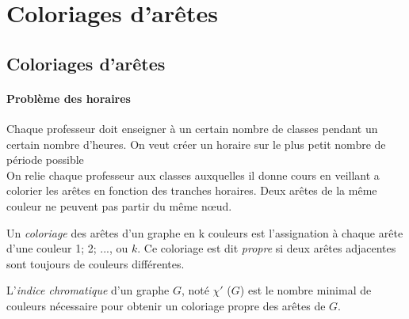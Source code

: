 \section{Coloriages d'arêtes}
\subsection{Coloriages d'arêtes}

\paragraph{Problème des horaires}
Chaque professeur doit enseigner à un certain nombre de classes pendant un certain nombre d'heures. On veut créer
un horaire sur le plus petit nombre de période possible
\\On relie chaque professeur aux classes auxquelles il donne cours en veillant a colorier les arêtes en fonction des tranches horaires. Deux arêtes de la même couleur ne peuvent pas partir du même nœud.

\begin{mydef}
  Un \emph{coloriage} des arêtes d’un graphe en k couleurs est l’assignation à chaque arête d’une couleur 1; 2; ..., ou $k$. Ce coloriage est dit \emph{propre} si deux arêtes adjacentes sont toujours de couleurs différentes.
\end{mydef}

\begin{mydef}
  L’\emph{indice chromatique} d’un graphe $G$, noté $\chi '$ ($G$) est le nombre minimal de couleurs nécessaire pour obtenir un coloriage propre des arêtes de $G$.
\end{mydef}


